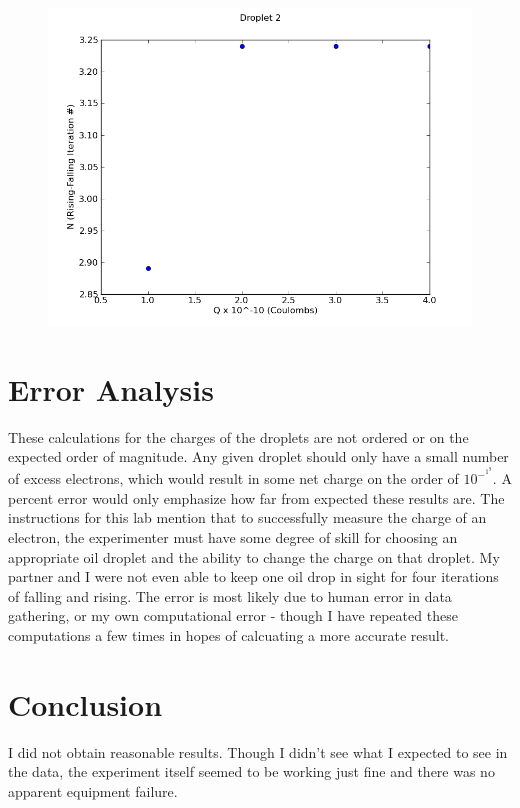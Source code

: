 \documentclass[12pt]{article}
\begin{document}
\begin{figure}[H]
\centering
\hspace{-0.0in}\includegraphics[scale=0.60]{Plot3.png}
\end{figure}

\section{Error Analysis}
\indent \indent These calculations for the charges of the droplets are not ordered or on the expected order of magnitude. Any given droplet should only have a small number of excess electrons, which would result in some net charge on the order of $10^-^1^9$. A percent error would only emphasize how far from expected these results are. The instructions for this lab mention that to successfully measure the charge of an electron, the experimenter must have some degree of skill for choosing an appropriate oil droplet and the ability to change the charge on that droplet. My partner and I were not even able to keep one oil drop in sight for four iterations of falling and rising. The error is most likely due to human error in data gathering, or my own computational error - though I have repeated these computations a few times in hopes of calcuating a more accurate result.

\section{Conclusion}
\indent \indent I did not obtain reasonable results. Though I didn't see what I expected to see in the data, the experiment itself seemed to be working just fine and there was no apparent equipment failure.
\end{document}
